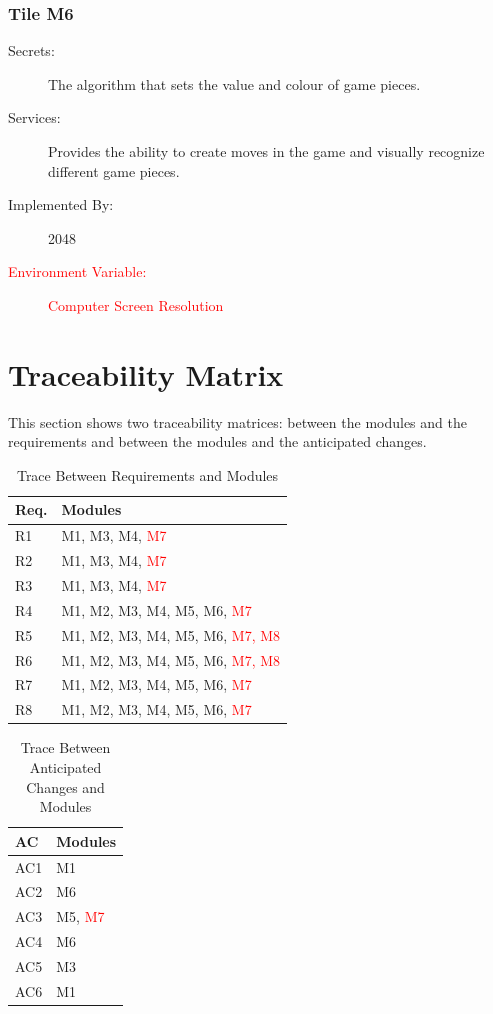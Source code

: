 \documentclass[12pt]{article}
\begin{document}
\subsubsection{Tile \textbf{M6}}

\begin{description}
\item[Secrets:] The algorithm that sets the value and colour of game pieces.
\item[Services:] Provides the ability to create moves in the game and visually recognize different game pieces.
\item[Implemented By:] 2048
\item[\textcolor{red}{Environment Variable:} ]\textcolor{red}{Computer Screen Resolution} 
\end{description}


\section{Traceability Matrix}
This section shows two traceability matrices: between the modules and 
the 
requirements and between the modules and the anticipated changes. 
\smallskip
\begin{table}[!htbp]
	\centering
	\begin{tabular}{p{3cm}|p{9cm}}
		\textbf{Req.} & \textbf{Modules} \\\hline
		R1 & M1, M3, M4, \textcolor{red}{M7}\\
		R2 & M1, M3, M4, \textcolor{red}{M7}\\
		R3 & M1, M3, M4, \textcolor{red}{M7}\\
		R4 & M1, M2, M3, M4, M5, M6, \textcolor{red}{M7} \\
		R5 & M1, M2, M3, M4, M5, M6, \textcolor{red}{M7, M8}\\
		R6 & M1, M2, M3, M4, M5, M6, \textcolor{red}{M7, M8}\\
		R7 & M1, M2, M3, M4, M5, M6, \textcolor{red}{M7}\\
		R8 & M1, M2, M3, M4, M5, M6, \textcolor{red}{M7}\\\hline
	\end{tabular}
	\caption{Trace Between Requirements and Modules}
	\label{Trace Between Requirements and Modules}
\end{table}
\begin{table}[!htbp]
	\centering
	\begin{tabular}{p{3cm}|p{9cm}}
		\textbf{AC} & \textbf{Modules} \\\hline
		AC1 & M1 \\ 
		AC2 &  M6\\  
		AC3 &  M5, \textcolor{red}{M7}\\  
		AC4 &  M6\\ 
		AC5 & M3\\ 
		AC6 & M1\\ \hline
	\end{tabular}
	\caption{Trace Between Anticipated Changes and Modules}
	\label{Trace Between Anticipated Changes and Modules}
\end{table}
\newpage
\end{document}
